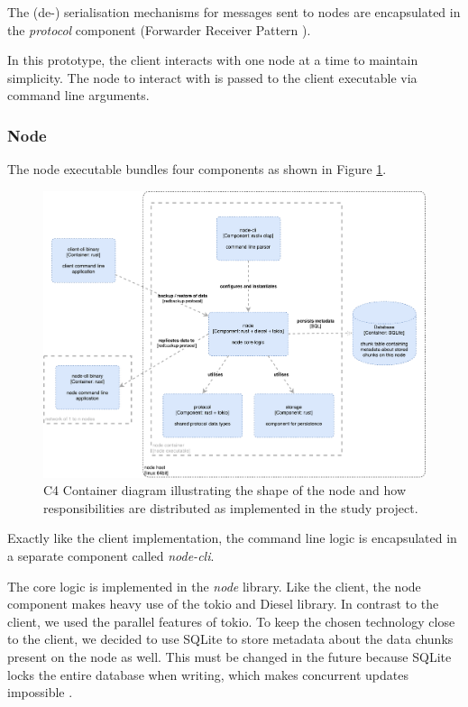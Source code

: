 The (de-) serialisation mechanisms for messages sent to \glspl{node} are encapsulated in the \emph{protocol} component (Forwarder Receiver Pattern \cite{POSA1}).

In this prototype, the \gls{client} interacts with one \gls{node} at a time to maintain simplicity. The \gls{node} to interact with is passed to the \gls{client} executable via command line arguments.

\subsubsection{Node}

The \gls{node} executable bundles four components as shown in Figure \ref{fig:c4-node-container}.  

\begin{figure}[h]
	\centering
	\includegraphics[width=1\linewidth]{resources/c4-node-container}
	\caption[Node specific C4 Container diagram]{C4 Container diagram illustrating the shape of the \gls{node} and how responsibilities are distributed as implemented in the study project.}
	\label{fig:c4-node-container}
\end{figure}

Exactly like the \gls{client} implementation, the command line logic is encapsulated in a separate component called \emph{node-cli}.

The core logic is implemented in the \emph{node} library. Like the client, the \gls{node} component makes heavy use of the tokio and Diesel library. In contrast to the client, we used the parallel features of tokio. To keep the chosen technology close to the client, we decided to use SQLite to store metadata about the data \glspl{chunk} present on the \gls{node} as well. This must be changed in the future because SQLite locks the entire database when writing, which makes concurrent updates impossible \cite{sqlite-locking}.

